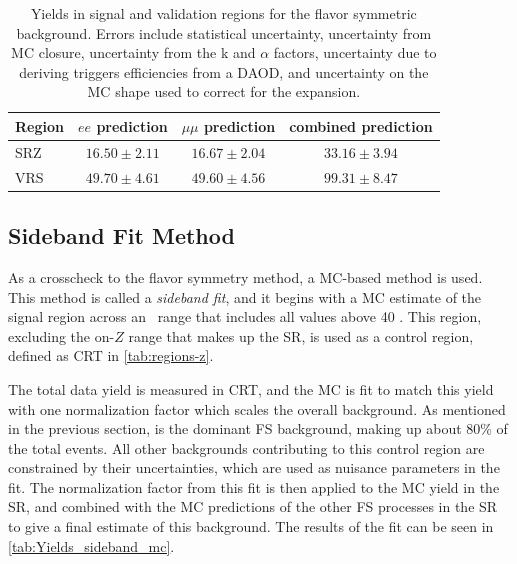 \begin{table}
\begin{center}
 \begin{tabular}{lccc}
   \hline 
   Region & $ee$ prediction & $\mu\mu$ prediction & combined prediction \\
   \hline
   \hline
SRZ & $ 16.50 \pm 2.11 $ & $ 16.67 \pm 2.04 $ & $ 33.16 \pm 3.94 $ \\
VRS & $ 49.70 \pm 4.61 $ & $ 49.60 \pm 4.56 $ & $ 99.31 \pm 8.47 $ \\
\hline
\hline
 \end{tabular}
\end{center}
 \caption{
   Yields in signal and validation regions for the flavor symmetric background. 
Errors include statistical uncertainty, uncertainty from MC closure, uncertainty from the k and $\alpha$ factors, 
uncertainty due to deriving triggers efficiencies from a DAOD, and uncertainty on the MC shape used to correct for the \mll expansion. 
 }
 \label{tab:fs_yields}
\end{table}

\subsection{Sideband Fit Method}
\label{sec:method-sideband}

As a crosscheck to the flavor symmetry method, a \ac{MC}-based method is used. This method is called a \textit{sideband fit}, and it begins with a \ac{MC} estimate of the signal region across an \mll~range that includes all values above 40 \gev. This region, excluding the on-$Z$ range that makes up the \ac{SR}, is used as a control region, defined as CRT in \autoref{tab:regions-z}. 

The total data yield is measured in CRT, and the \ac{MC} is fit to match this yield with one normalization factor which scales the overall \ttbar background. As mentioned in the previous section, \ttbar is the dominant \ac{FS} background, making up about 80\% of the total events. All other backgrounds contributing to this control region are constrained by their uncertainties, which are used as nuisance parameters in the fit. The normalization factor from this fit is then applied to the \ttbar \ac{MC} yield in the \ac{SR}, and combined with the \ac{MC} predictions of the other \ac{FS} processes in the \ac{SR} to give a final estimate of this background. The results of the fit can be seen in \autoref{tab:Yields_sideband_mc}. 

